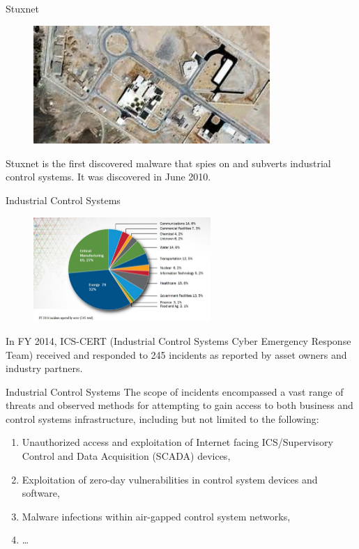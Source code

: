 \documentclass[10pt]{beamer}
\begin{document}
\begin{frame}{Stuxnet}
  \begin{figure}[ht]
    \centering
    \includegraphics[width=0.8\textwidth]{stuxnet.jpg}
  \end{figure}
  Stuxnet is the first discovered malware that spies on and subverts industrial control systems. It was discovered in June 2010. 
\end{frame}

\begin{frame}{Industrial Control Systems}
  \begin{figure}[ht]
    \centering
    \includegraphics[width=0.6\textwidth]{cert.jpg}
  \end{figure}
 In FY 2014, ICS-CERT (Industrial Control Systems Cyber Emergency Response Team) received and responded to 245 incidents as reported by asset owners and industry partners.
\end{frame}


\begin{frame}{Industrial Control Systems}
   The scope of incidents encompassed a vast range of threats and observed methods for attempting to gain access to both business and control systems infrastructure, including but not limited to the following:
  \begin{enumerate}
  \item  Unauthorized access and exploitation of Internet facing ICS/Supervisory Control and Data Acquisition (SCADA) devices,
  \item 	 Exploitation of zero-day vulnerabilities in control system devices and software, 
  \item  	 Malware infections within air-gapped control system networks,
  \item \dots
  \end{enumerate}

\end{frame}
\end{document}
